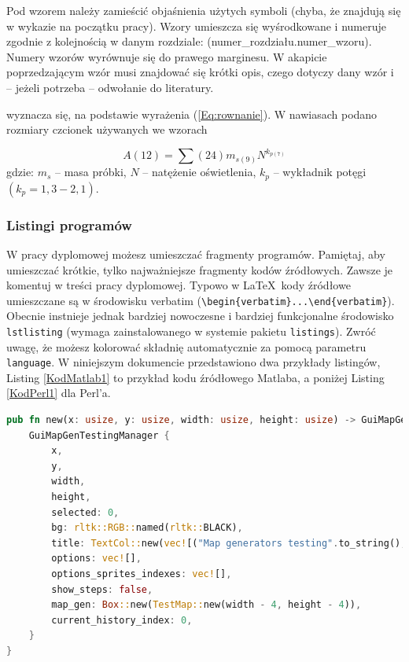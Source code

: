 \documentclass[12pt,twoside]{article}
\begin{document}
Pod wzorem należy zamieścić objaśnienia użytych symboli (chyba, że znajdują się w wykazie na początku pracy). Wzory umieszcza się wyśrodkowane i numeruje zgodnie
z kolejnością w danym rozdziale: (numer\_rozdziału.numer\_wzoru). Numery wzorów wyrównuje się do prawego marginesu. W akapicie poprzedzającym wzór musi znajdować się krótki opis, czego dotyczy dany wzór i – jeżeli potrzeba – odwołanie do literatury.

\begin{example}
[\ldots] wyznacza się, na podstawie wyrażenia (\ref{Eq:rownanie}). W nawiasach podano rozmiary czcionek używanych we wzorach
\end{example}

\begin{equation}
A(12)={\sum}(24)m_{s(9)}N^{k_{p(7)}}
\label{Eq:rownanie}
\end{equation}
gdzie: $m_s$ -- masa próbki, $N$ -- natężenie oświetlenia, $k_p$ -- wykładnik potęgi $(k_p=1,3-2,1)$.\\
\newpage
{\subsubsection{Listingi programów}}

W pracy dyplomowej możesz umieszczać fragmenty programów. Pamiętaj, aby umieszczać krótkie, tylko najważniejsze fragmenty kodów źródłowych. Zawsze je komentuj w treści
pracy dyplomowej. Typowo w \LaTeX\ kody źródłowe umieszczane są w środowisku verbatim (\verb|\begin{verbatim}...\end{verbatim}|). Obecnie instnieje jednak bardziej nowoczesne i bardziej funkcjonalne środowisko \verb|lstlisting| (wymaga zainstalowanego w systemie pakietu \verb|listings|). Zwróć uwagę, że możesz kolorować składnię
automatycznie za pomocą parametru \verb|language|. W niniejszym dokumencie przedstawiono dwa przykłady listingów, Listing \ref{KodMatlab1} to przykład kodu źródłowego Matlaba, a poniżej Listing \ref{KodPerl1} dla Perl'a.\\


\begin{lstlisting}[language=Rust,caption=Listing programu Matlab,label={KodMatlab1}]
pub fn new(x: usize, y: usize, width: usize, height: usize) -> GuiMapGenTestingManager {
	GuiMapGenTestingManager {
		x,
		y,
		width,
		height,
		selected: 0,
		bg: rltk::RGB::named(rltk::BLACK),
		title: TextCol::new(vec![("Map generators testing".to_string(),rltk::RGB::named(rltk::WHITE))]),
		options: vec![],
		options_sprites_indexes: vec![],
		show_steps: false,
		map_gen: Box::new(TestMap::new(width - 4, height - 4)),
		current_history_index: 0,
	}
}
\end{lstlisting}
\end{document}
